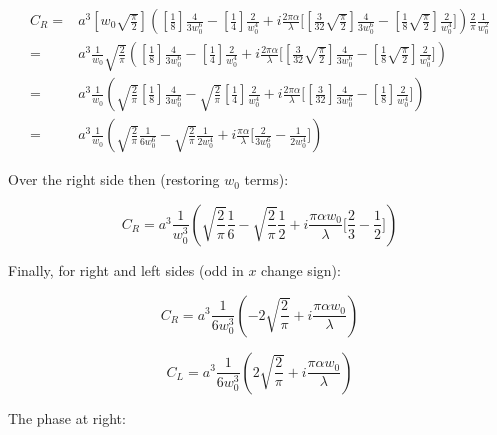 \documentclass[aps,twoside,secnumarabic,balancelastpage,amsmath,amssymb,nofootinbib,hyperref=pdftex]{revtex4}
\begin{document}
\begin{align*}
C_R =&
		a^3
		[
			w_0 \sqrt{\frac{\pi}{2}}
		]
		(
			[\frac{1}{8}]
			\frac{4}{3w_0^6}
			-
			[\frac{1}{4}]
			\frac{2}{w_0^4}
		+
		i\frac{2 \pi  \alpha}{\lambda}
		\big[
			[\frac{3}{32} \sqrt{\frac{\pi}{2}}]
			\frac{4}{3w_0^6}
			-
			[\frac{1}{8} \sqrt{\frac{\pi}{2}}]
			\frac{2}{w_0^4}
		\big]
		)
		\frac{2}{\pi}\frac{1}{w_0^2}
		\\
		=&
		a^3 \frac{1}{w_0}
			\sqrt{\frac{2}{\pi}}
		(
			[\frac{1}{8}]
			\frac{4}{3w_0^6}
			-
			[\frac{1}{4}]
			\frac{2}{w_0^4}
		+
		i\frac{2 \pi  \alpha}{\lambda}
		\big[
			[\frac{3}{32} \sqrt{\frac{\pi}{2}}]
			\frac{4}{3w_0^6}
			-
			[\frac{1}{8} \sqrt{\frac{\pi}{2}}]
			\frac{2}{w_0^4}
		\big]
		)	
		\\
				=&
		a^3 \frac{1}{w_0}
		(
			\sqrt{\frac{2}{\pi}}
			[\frac{1}{8}]
			\frac{4}{3w_0^6}
			-
			\sqrt{\frac{2}{\pi}}
			[\frac{1}{4}]
			\frac{2}{w_0^4}
		+
		i\frac{2 \pi  \alpha}{\lambda}
		\big[
			[\frac{3}{32}]
			\frac{4}{3w_0^6}
			-
			[\frac{1}{8} ]
			\frac{2}{w_0^4}
		\big]
		)
		\\
						=&
		a^3 \frac{1}{w_0}
		(
			\sqrt{\frac{2}{\pi}}
			\frac{1}{6 w_0^6}
			-
			\sqrt{\frac{2}{\pi}}
			\frac{1}{2 w_0^4}
		+
		i\frac{ \pi  \alpha}{\lambda}
		\big[
			\frac{2}{3w_0^6}
			-
			\frac{1}{2 w_0^4}
		\big]
		)
\end{align*}

Over the right side then (restoring $w_0$ terms):

\begin{equation*}
C_R=
			a^3
			\frac{1}{w_0^3}
		(
			\sqrt{\frac{2}{\pi}}
			\frac{1}{6}
			-
			\sqrt{\frac{2}{\pi}}
			\frac{1}{2}
		+
		i\frac{ \pi  \alpha w_0}{\lambda}
		\big[
			\frac{2}{3}
			-
			\frac{1}{2}
		\big]
		)
\end{equation*}

Finally, for right and left sides (odd in $x$ change sign):

\begin{equation*}
C_R=
			a^3
			\frac{1}{6 w_0^3}
		(
			-2 \sqrt{\frac{2}{\pi}}		
		+
		i\frac{ \pi  \alpha w_0}{\lambda}
		)
\end{equation*}

\begin{equation*}
C_L=
			a^3
			\frac{1}{6 w_0^3}
		(
			2 \sqrt{\frac{2}{\pi}}		
		+
		i\frac{ \pi  \alpha w_0}{\lambda}
		)
\end{equation*}

The phase at right:
\end{document}
